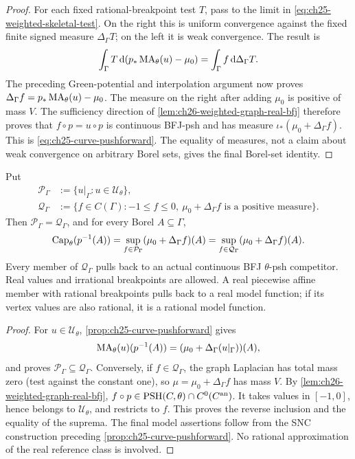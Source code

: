 \begin{proof}
For each fixed rational-breakpoint test \(T\), pass to the limit in
\eqref{eq:ch25-weighted-skeletal-test}.  On the right this is uniform
convergence against the fixed finite signed measure
\(\Delta_\Gamma T\); on the left it is weak convergence.
The result is
\[
 \int_\Gamma T\,\mathrm d(p_*\operatorname{MA}_\theta(u)-\mu_0)
       =\int_\Gamma f\,\mathrm d\Delta_\Gamma T.
\]
The preceding Green-potential and interpolation argument now proves
\(\Delta_\Gamma f=p_*\operatorname{MA}_\theta(u)-\mu_0\).
The measure on the right after adding \(\mu_0\) is positive of mass
\(V\).  The sufficiency direction of
\cref{lem:ch26-weighted-graph-real-bfj} therefore proves that
\(f\circ p=u\circ p\) is continuous BFJ-psh and has measure
\(\iota_*(\mu_0+\Delta_\Gamma f)\).  This is
\eqref{eq:ch25-curve-pushforward}.  The equality of measures, not a
claim about weak convergence on arbitrary Borel sets, gives the
final Borel-set identity.
\end{proof}

\begin{corollary}
\label{cor:ch25-curve-capacity-formula}
Put
\[
 \begin{aligned}
 \mathcal P_\Gamma
  &:=\{u|_\Gamma:u\in\mathcal U_\theta\},\\
 \mathcal Q_\Gamma
  &:=\{f\in C(\Gamma): -1\leq f\leq0,\
                \mu_0+\Delta_\Gamma f\text{ is a positive measure}\}.
 \end{aligned}
\]
Then \(\mathcal P_\Gamma=\mathcal Q_\Gamma\), and for every Borel
\(A\subseteq\Gamma\),
\begin{equation}
\label{eq:ch25-curve-capacity}
 \operatorname{Cap}_\theta(p^{-1}(A))
   =\sup_{f\in\mathcal P_\Gamma}(\mu_0+\Delta_\Gamma f)(A)
   =\sup_{f\in\mathcal Q_\Gamma}(\mu_0+\Delta_\Gamma f)(A).
\end{equation}
Every member of \(\mathcal Q_\Gamma\) pulls back to an actual
continuous BFJ \(\theta\)-psh competitor.  Real values and irrational
breakpoints are allowed.  A real piecewise affine member with
rational breakpoints pulls back to a real model function; if its
vertex values are also rational, it is a rational model function.
\end{corollary}

\begin{proof}
For \(u\in\mathcal U_\theta\),
\cref{prop:ch25-curve-pushforward} gives
\[
 \operatorname{MA}_\theta(u)(p^{-1}(A))
   =(\mu_0+\Delta_\Gamma(u|_\Gamma))(A),
\]
and proves \(\mathcal P_\Gamma\subseteq\mathcal Q_\Gamma\).
Conversely, if \(f\in\mathcal Q_\Gamma\), the graph Laplacian has
total mass zero (test against the constant one), so
\(\mu=\mu_0+\Delta_\Gamma f\) has mass \(V\).
By \cref{lem:ch26-weighted-graph-real-bfj},
\(f\circ p\in\operatorname{PSH}(C,\theta)\cap C^0(C^{\mathrm{an}})\).
It takes values in \([-1,0]\), hence belongs to
\(\mathcal U_\theta\), and restricts to \(f\).
This proves the reverse inclusion and the equality of the suprema.
The final model assertions follow from the SNC construction preceding
\cref{prop:ch25-curve-pushforward}.  No rational approximation of the
real reference class is involved.
\end{proof}

